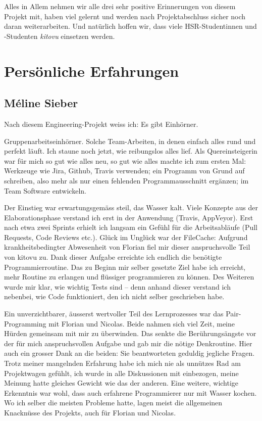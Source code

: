 \documentclass[a4paper]{article}
\let\oldsection\section
\renewcommand\section{\clearpage\oldsection}
\begin{document}
Alles in Allem nehmen wir alle drei sehr positive Erinnerungen von diesem Projekt mit, haben viel gelernt und werden nach Projektabschluss sicher noch daran weiterarbeiten. Und natürlich hoffen wir, dass viele HSR-Studentinnen und -Studenten \emph{kitovu} einsetzen werden.

  \section{Persönliche Erfahrungen}

  \subsection{Méline Sieber}

Nach diesem Engineering-Projekt weiss ich: Es gibt Einhörner.

Gruppenarbeitseinhörner. Solche Team-Arbeiten, in denen einfach alles rund und perfekt läuft. Ich staune noch jetzt, wie reibungslos alles lief. Als Quereinsteigerin war für mich so gut wie alles neu, so gut wie alles machte ich zum ersten Mal: Werkzeuge wie Jira, Github, Travis verwenden; ein Programm von Grund auf schreiben, also mehr als nur einen fehlenden Programmausschnitt ergänzen; im Team Software entwickeln.

Der Einstieg war erwartungsgemäss steil, das Wasser kalt. Viele Konzepte aus der Elaborationsphase verstand ich erst in der Anwendung (Travis, AppVeyor). Erst nach etwa zwei Sprints erhielt ich langsam ein Gefühl für die Arbeitsabläufe (Pull Requests, Code Reviews etc.). Glück im Unglück war der FileCache: Aufgrund krankheitsbedingter Abwesenheit von Florian fiel mir dieser anspruchsvolle Teil von kitovu zu. Dank dieser Aufgabe erreichte ich endlich die benötigte Programmierroutine. Das zu Beginn mir selber gesetzte Ziel habe ich erreicht, mehr Routine zu erlangen und flüssiger programmieren zu können. Des Weiteren wurde mir klar, wie wichtig Tests sind -- denn anhand dieser verstand ich nebenbei, wie Code funktioniert, den ich nicht selber geschrieben habe.

Ein unverzichtbarer, äusserst wertvoller Teil des Lernprozesses war das Pair-Programming mit Florian und Nicolas. Beide nahmen sich viel Zeit, meine Hürden gemeinsam mit mir zu überwinden. Das senkte die Berührungsängste vor der für mich anspruchsvollen Aufgabe und gab mir die nötige Denkroutine. Hier auch ein grosser Dank an die beiden: Sie beantworteten geduldig jegliche Fragen. Trotz meiner mangelnden Erfahrung habe ich mich nie als unnützes Rad am Projektwagen gefühlt, ich wurde in alle Diskussionen mit einbezogen, meine Meinung hatte gleiches Gewicht wie das der anderen. Eine weitere, wichtige Erkenntnis war wohl, dass auch erfahrene Programmierer nur mit Wasser kochen. Wo ich selber die meisten Probleme hatte, lagen meist die allgemeinen Knacknüsse des Projekts, auch für Florian und Nicolas.
\end{document}
